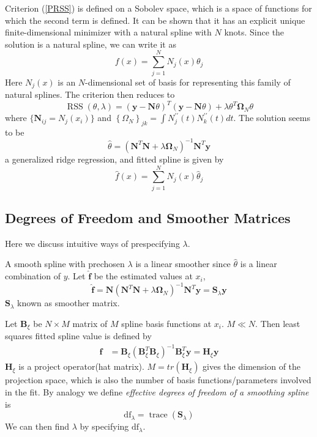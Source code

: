 Criterion (\ref{PRSS}) is defined on a Sobolev space, which is a space of functions for which the second
term is defined. It can be shown that it has an explicit unique finite-dimensional minimizer
with a natural spline with $N$ knots. Since the solution is a natural spline, we can write it
as
\begin{equation*}
    f(x)=\sum_{j=1}^{N} N_{j}(x) \theta_{j}
\end{equation*}
Here $N_j(x)$ is an $N$-dimensional set of basis for representing this family of natural 
splines. The criterion then reduces to
\begin{equation*}
    \operatorname{RSS}(\theta, \lambda)=(\mathbf{y}-\mathbf{N} \theta)^{T}(\mathbf{y}-\mathbf{N} 
    \theta)+\lambda \theta^{T} \mathbf{\Omega}_{N} \theta
\end{equation*}
where $\{\mathbf{N}_{ij}=N_j(x_i)\}$ and 
$\left\{\Omega_{N}\right\}_{j k}=\int N_{j}^{\prime \prime}(t) N_{k}^{\prime \prime}(t) d t$.
The solution seems to be 
\begin{equation*}
    \hat{\theta}=\left(\mathbf{N}^{T} \mathbf{N}+\lambda 
    \mathbf{\Omega}_{N}\right)^{-1} \mathbf{N}^{T} \mathbf{y}
\end{equation*}
a generalized ridge regression, and fitted spline is given by
\begin{equation*}
    \hat{f}(x)=\sum_{j=1}^{N} N_{j}(x) \hat{\theta}_{j}
\end{equation*}

\subsection{Degrees of Freedom and Smoother Matrices}
Here we discuss intuitive ways of prespecifying $\lambda$. 

A smooth spline with prechosen $\lambda$ is a linear smoother since $\hat{\theta}$ is a linear
combination of $y$. Let $\hat{\mathbf{f}}$ be the estimated values at $x_i$, 
\begin{equation*}
\hat{\mathbf{f}}=\mathbf{N}\left(\mathbf{N}^{T} \mathbf{N}
+\lambda\mathbf{\Omega}_{N}\right)^{-1}\mathbf{N}^{T}\mathbf{y}
=\mathbf{S}_{\lambda} \mathbf{y}
\end{equation*}
$\mathbf{S}_{\lambda}$ known as smoother matrix. 

Let $\mathbf{B}_\xi$ be $N\times M$ matrix of $M$ spline basis functions at $x_i$. $M \ll N$. 
Then least squares fitted spline value is defined by
\begin{align*} 
\hat{\mathbf{f}}&=\mathbf{B}_{\xi}\left(\mathbf{B}_{\xi}^{T} \mathbf{B}_{\xi}\right)^{-1}
\mathbf{B}_{\xi}^{T} \mathbf{y}=\mathbf{H}_{\xi} \mathbf{y} 
\end{align*}
$\mathbf{H}_{\xi}$ is a project operator(hat matrix). $M=tr(\mathbf{H}_\xi)$ gives the 
dimension of the projection space, which is also the number of basis functions/parameters
involved in the fit. By analogy we define \textit{effective degrees of freedom of a smoothing
spline} is
\begin{equation*}
    \mathrm{df}_{\lambda}=\operatorname{trace}\left(\mathbf{S}_{\lambda}\right)
\end{equation*}
We can then find $\lambda$ by specifying $\mathrm{df}_{\lambda}$. 

